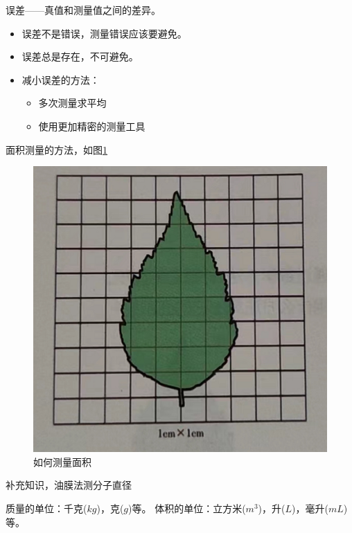 \documentclass[windows,csize4]{BHCexam}
\begin{document}
\begin{groups}
误差——真值和测量值之间的差异。
\begin{itemize}
    \item 误差不是错误，测量错误应该要避免。
    \item 误差总是存在，不可避免。
    \item 减小误差的方法：
    \begin{itemize}
        \item 多次测量求平均
        \item 使用更加精密的测量工具
    \end{itemize}

\end{itemize}


面积测量的方法，如图\ref{fig:fig_1_6}
\begin{figure}[htb]
    \centering
    \includegraphics [scale=0.35,trim=0 0 0 0]{./image/fig_1_6.PNG}
    \caption{如何测量面积} 
    \label{fig:fig_1_6}
\end{figure}

补充知识，油膜法测分子直径

质量的单位：千克($kg$)，克($g$)等。
体积的单位：立方米($m^3$)，升($L$)，毫升($mL$)等。


\end{groups}
\end{document}

